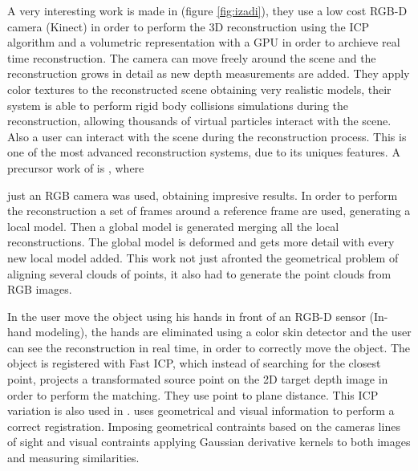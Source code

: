  
A very interesting work is made in \cite{izadi}(figure \ref{fig:izadi}), they use a low cost RGB-D camera (Kinect) in order to perform
the 3D reconstruction using the ICP algorithm  and a volumetric representation with a GPU in order to 
archieve real time reconstruction. The camera can move freely around the scene and the reconstruction grows in detail 
as new depth measurements are added. They apply color textures to the reconstructed scene obtaining very 
realistic models, their system is able to perform rigid body collisions 
simulations during the reconstruction, allowing thousands of virtual particles interact with the scene. Also a 
user can interact with the scene during the reconstruction process. This is one of the most advanced 
reconstruction systems, due to its uniques features. A precursor work of \cite{izadi} is \cite{Newcombe10livedense}, where 
 
just an RGB camera was used, obtaining impresive results. In order to perform the reconstruction a set of frames around 
a reference frame are used, generating a local model. Then a global model is generated merging all the local reconstructions.
The global model is deformed and gets more detail with every new local model added. This work not just afronted 
the geometrical problem of aligning several clouds of points, it also had to generate the point clouds from RGB images.


In \cite{weise08} the user move the object using his hands in front of an RGB-D sensor (In-hand modeling), the hands are 
eliminated using a color skin detector and the user can see the reconstruction in real time, in order to correctly 
move the object.  The object is registered with Fast ICP, which instead of searching for the closest 
point, projects a transformated source point on the 2D target depth image in order to perform the matching. They use point
 to plane distance. This ICP variation is also used in \cite{jaeggli03}. \cite{weise08} uses geometrical and visual 
information to perform a correct registration. Imposing geometrical contraints based on the cameras lines of sight and visual 
contraints applying Gaussian derivative kernels to both images and measuring similarities.


